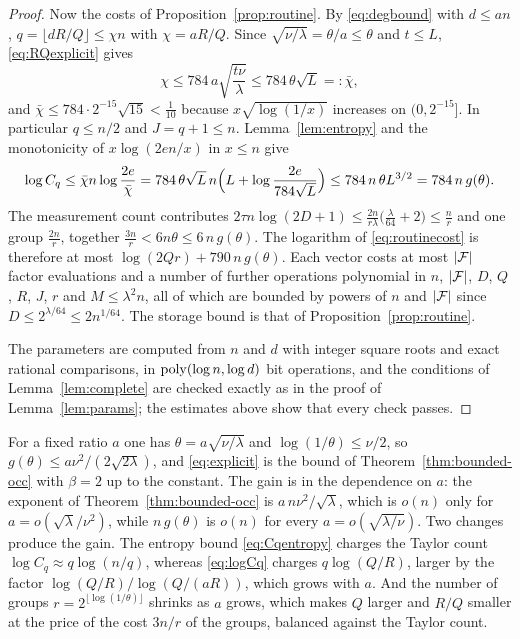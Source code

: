 \begin{proof}
Now the costs of Proposition~\ref{prop:routine}. By \eqref{eq:degbound} with
$d\le an$, $q=\lfloor dR/Q\rfloor\le\chi n$ with $\chi=aR/Q$. Since
$\sqrt{\nu/\lambda}=\theta/a\le\theta$ and $t\le L$, \eqref{eq:RQexplicit} gives
\[
  \chi\le784\,a\sqrt{\frac{t\nu}{\lambda}}\le784\,\theta\sqrt L=:\bar\chi ,
\]
and $\bar\chi\le784\cdot2^{-15}\sqrt{15}<\frac1{10}$ because $x\sqrt{\log(1/x)}$
increases on $(0,2^{-15}]$. In particular $q\le n/2$ and $J=q+1\le n$.
Lemma~\ref{lem:entropy} and the monotonicity of $x\log(2en/x)$ in $x\le n$ give
\[
  \log C_q\le\bar\chi n\log\frac{2e}{\bar\chi}
  =784\,\theta\sqrt L\,n\Bigl(L+\log\frac{2e}{784\sqrt L}\Bigr)\le784\,n\,\theta L^{3/2}
  =784\,n\,g(\theta).
\]
The measurement count contributes
$2\tau n\log(2D+1)\le\frac{2n}{r\lambda}\bigl(\frac\lambda{64}+2\bigr)\le\frac nr$
and one group $\frac{2n}r$, together $\frac{3n}{r}<6n\theta\le6\,n\,g(\theta)$.
The logarithm of \eqref{eq:routinecost} is therefore at most
$\log(2Qr)+790\,n\,g(\theta)$. Each vector costs at most $|\mathcal{F}|$ factor evaluations
and a number of further operations polynomial in $n$, $|\mathcal{F}|$, $D$, $Q$, $R$, $J$,
$r$ and $M\le\lambda^2 n$, all of which are bounded by powers of $n$ and $|\mathcal{F}|$
since $D\le2^{\lambda/64}\le2n^{1/64}$. The storage bound is that of
Proposition~\ref{prop:routine}.

The parameters are computed from $n$ and $d$ with integer square roots and
exact rational comparisons, in $\operatorname{poly}(\log n,\log d)$ bit operations,
and the conditions of Lemma~\ref{lem:complete} are checked exactly as in the proof
of Lemma~\ref{lem:params}; the estimates above show that every check passes.
\end{proof}

For a fixed ratio $a$ one has $\theta=a\sqrt{\nu/\lambda}$ and $\log(1/\theta)\le\nu/2$,
so $g(\theta)\le a\nu^2/(2\sqrt{2\lambda})$, and \eqref{eq:explicit} is the bound of
Theorem~\ref{thm:bounded-occ} with $\beta=2$ up to the constant. The gain is in the
dependence on $a$: the exponent of Theorem~\ref{thm:bounded-occ} is
$a\,n\nu^2/\sqrt\lambda$, which is $o(n)$ only for $a=o(\sqrt\lambda/\nu^2)$, while
$n\,g(\theta)$ is $o(n)$ for every $a=o(\sqrt{\lambda/\nu})$. Two changes produce the
gain. The entropy bound \eqref{eq:Cqentropy} charges the Taylor count
$\log C_q\approx q\log(n/q)$, whereas \eqref{eq:logCq} charges $q\log(Q/R)$, larger by
the factor $\log(Q/R)/\log(Q/(aR))$, which grows with $a$. And the number of groups
$r=2^{\lfloor\log(1/\theta)\rfloor}$ shrinks as $a$ grows, which makes $Q$ larger and
$R/Q$ smaller at the price of the cost $3n/r$ of the groups, balanced against the
Taylor count.

